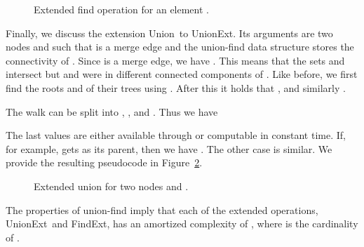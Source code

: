 \documentclass[a4paper,11pt]{article}
\def\findext{\mbox{\sc FindExt}}
\def\union{\mbox{\sc Union}}
\def\unionext{\mbox{\sc UnionExt}}
\begin{document}
\begin{figure}[htb]
	\centering
	\ovalbox{
	\parbox{9cm}
	{\vspace{.4cm}\begin{algorithm}{\findext}{}
		\qif  \qthen\\
			\\
			\\
			
		\qfi\\
		\qreturn 
	\end{algorithm}}}
	\caption{Extended find operation for an element .}
	\label{fig:code2}
\end{figure}

Finally, we discuss the extension \union\ to \unionext. 
Its arguments are two nodes  and  such that
 is a merge edge and the union-find data structure stores the
connectivity of . Since  is a merge edge,
we have .
This means that the sets  and  intersect but 
 and  were in different connected components of .
Like before, we first find the roots  and  of their trees 
using . After this it holds that
, and similarly
.

The walk 
can be split into , , and .
Thus we have

The last values are either available through  
or computable in constant time. 
If, for example,  gets  as its parent, then
we have . The other case
is similar. We provide the resulting pseudocode in Figure~\ref{fig:code3}.

\begin{figure}[htb]
	\centering
	\ovalbox{
	\parbox{8cm}
	{\vspace{.4cm}\begin{algorithm}{\unionext}{}
		\\
		\\
		\\
		\qif  \qthen\\
			\\
			
		\qelse (*  *)\\
			\\
			\\
			\qif  \qthen\\
				
			\qfi
		\qfi
	\end{algorithm}}}
	\caption{Extended union for two nodes  and .}
	\label{fig:code3}
\end{figure}

The properties of union-find imply that each of the extended operations,
\unionext\ and \findext, has an amortized
complexity of , where  is the cardinality of .
\end{document}
